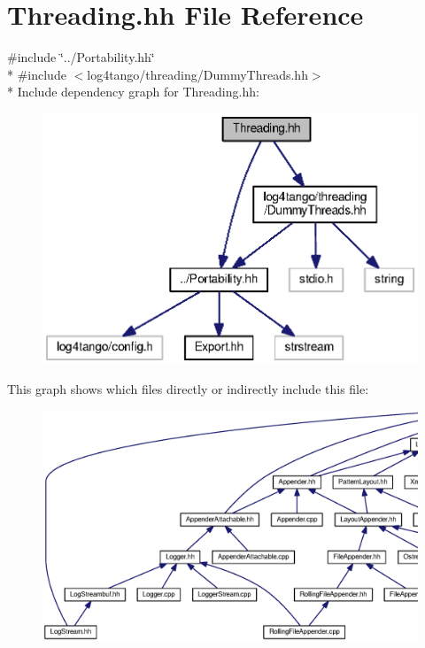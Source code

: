 \section{Threading.\-hh File Reference}
\label{Threading_8hh}
{\ttfamily \#include \char`\"{}../\-Portability.\-hh\char`\"{}}\\*
{\ttfamily \#include $<$log4tango/threading/\-Dummy\-Threads.\-hh$>$}\\*
Include dependency graph for Threading.\-hh\-:
\nopagebreak
\begin{figure}[H]
\begin{center}
\leavevmode
\includegraphics[width=345pt]{d2/df9/Threading_8hh__incl}
\end{center}
\end{figure}
This graph shows which files directly or indirectly include this file\-:
\nopagebreak
\begin{figure}[H]
\begin{center}
\leavevmode
\includegraphics[width=350pt]{d9/df2/Threading_8hh__dep__incl}
\end{center}
\end{figure}
